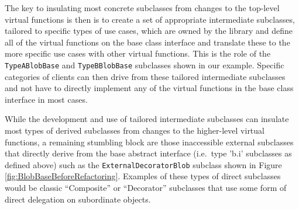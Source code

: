 \documentclass[pdf,ps2pdf,11pt]{SANDreport}
\begin{document}
The key to insulating most concrete subclasses from changes to the top-level
virtual functions is then is to create a set of appropriate intermediate
subclasses, tailored to specific types of use cases, which are owned by the
library and define all of the virtual functions on the base class interface
and translate these to the more specific use cases with other virtual
functions.  This is the role of the {}\texttt{Type\-A\-Blob\-Base} and
{}\texttt{Type\-B\-Blob\-Base} subclasses shown in our example.  Specific
categories of clients can then drive from these tailored intermediate
subclasses and not have to directly implement any of the virtual functions in
the base class interface in most cases.

While the development and use of tailored intermediate subclasses can insulate
most types of derived subclasses from changes to the higher-level virtual
functions, a remaining stumbling block are those inaccessible external
subclasses that directly derive from the base abstract interface (i.e.\ type
'b.i' subclasses as defined above) such as the
{}\texttt{External\-Decorator\-Blob} subclass shown in Figure
{}\ref{fig:BlobBaseBeforeRefactoring}.  Examples of these types of direct
subclasses would be classic ``Composite'' or ``Decorator'' subclasses that use
some form of direct delegation on subordinate objects.
\end{document}
